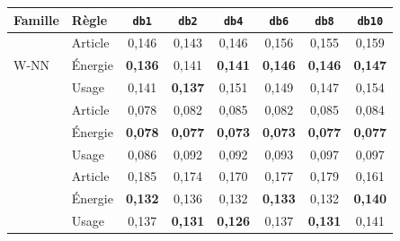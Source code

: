 \begin{tabular}{@{}llcccccc@{}}
\toprule
Famille & Règle & \texttt{db1} & \texttt{db2} & \texttt{db4} & \texttt{db6} & \texttt{db8} & \texttt{db10} \\
\midrule
\multirow{3}{*}{W-NN} & Article & 0{,}146 & 0{,}143 & 0{,}146 & 0{,}156 & 0{,}155 & 0{,}159 \\
 & Énergie & \textbf{0{,}136} & 0{,}141 & \textbf{0{,}141} & \textbf{0{,}146} & \textbf{0{,}146} & \textbf{0{,}147} \\
 & Usage & 0{,}141 & \textbf{0{,}137} & 0{,}151 & 0{,}149 & 0{,}147 & 0{,}154 \\
\addlinespace
\multirow{3}{*}{W-QDA} & Article & 0{,}078 & 0{,}082 & 0{,}085 & 0{,}082 & 0{,}085 & 0{,}084 \\
 & Énergie & \textbf{0{,}078} & \textbf{0{,}077} & \textbf{0{,}073} & \textbf{0{,}073} & \textbf{0{,}077} & \textbf{0{,}077} \\
 & Usage & 0{,}086 & 0{,}092 & 0{,}092 & 0{,}093 & 0{,}097 & 0{,}097 \\
\addlinespace
\multirow{3}{*}{W-CART} & Article & 0{,}185 & 0{,}174 & 0{,}170 & 0{,}177 & 0{,}179 & 0{,}161 \\
 & Énergie & \textbf{0{,}132} & 0{,}136 & 0{,}132 & \textbf{0{,}133} & 0{,}132 & \textbf{0{,}140} \\
 & Usage & 0{,}137 & \textbf{0{,}131} & \textbf{0{,}126} & 0{,}137 & \textbf{0{,}131} & 0{,}141 \\
\bottomrule
\end{tabular}
